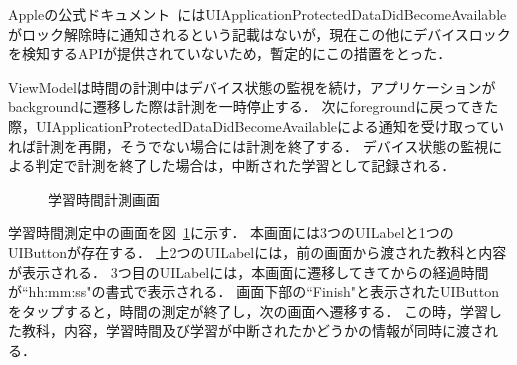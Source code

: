 Appleの公式ドキュメント~\cite{apple}にはUIApplicationProtectedDataDidBecomeAvailableがロック解除時に通知されるという記載はないが，現在この他にデバイスロックを検知するAPIが提供されていないため，暫定的にこの措置をとった．

ViewModelは時間の計測中はデバイス状態の監視を続け，アプリケーションがbackgroundに遷移した際は計測を一時停止する．
次にforegroundに戻ってきた際，UIApplicationProtectedDataDidBecomeAvailableによる通知を受け取っていれば計測を再開，そうでない場合には計測を終了する．
デバイス状態の監視による判定で計測を終了した場合は，中断された学習として記録される．

\begin{figure}[htb]
	\begin{center}
	\caption{学習時間計測画面}
	\label{fig:measure}
	\end{center}
\end{figure}

学習時間測定中の画面を図~\ref{fig:measure}に示す．
本画面には3つのUILabelと1つのUIButtonが存在する．
上2つのUILabelには，前の画面から渡された教科と内容が表示される．
3つ目のUILabelには，本画面に遷移してきてからの経過時間が``hh:mm:ss"の書式で表示される．
画面下部の``Finish"と表示されたUIButtonをタップすると，時間の測定が終了し，次の画面へ遷移する．
この時，学習した教科，内容，学習時間及び学習が中断されたかどうかの情報が同時に渡される．

